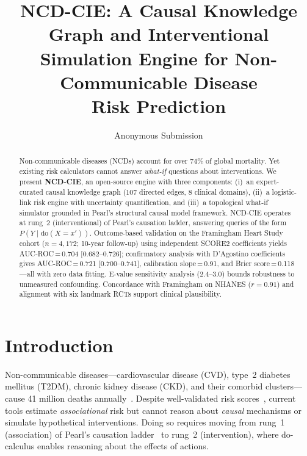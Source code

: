 \documentclass[runningheads]{llncs}
\begin{document}
\title{NCD-CIE: A Causal Knowledge Graph and Interventional\\Simulation Engine for Non-Communicable Disease\\Risk Prediction}

\author{Anonymous Submission}

\maketitle

\begin{abstract}
Non-communicable diseases (NCDs) account for over 74\% of global
mortality.
Yet existing risk calculators cannot answer \emph{what-if} questions
about interventions.
We present \textbf{NCD-CIE}, an open-source engine with three
components:
(i)~an expert-curated causal knowledge graph (107 directed edges,
8 clinical domains),
(ii)~a logistic-link risk engine with uncertainty quantification, and
(iii)~a topological what-if simulator grounded in Pearl's structural
causal model framework.
NCD-CIE operates at rung~2 (interventional) of Pearl's causation
ladder, answering queries of the form
$P(Y \mid \mathrm{do}(X\!=\!x'))$.
Outcome-based validation on the Framingham Heart Study cohort
($n\!=\!4{,}172$; 10-year follow-up) using independent SCORE2
coefficients yields AUC-ROC\,=\,0.704 [0.682--0.726]; confirmatory
analysis with D'Agostino coefficients gives
AUC-ROC\,=\,0.721 [0.700--0.741],
calibration slope\,=\,0.91, and Brier score\,=\,0.118---all with
zero data fitting.
E-value sensitivity analysis (2.4--3.0) bounds robustness to
unmeasured confounding.
Concordance with Framingham on NHANES ($r\!=\!0.91$) and alignment
with six landmark RCTs support clinical plausibility.

\end{abstract}

\section{Introduction}\label{sec:intro}

Non-communicable diseases---cardiovascular disease (CVD), type~2
diabetes mellitus (T2DM), chronic kidney disease (CKD), and their
comorbid clusters---cause 41 million deaths
annually~\cite{who2021ncd}.
Despite well-validated risk scores~\cite{dagostino2008,hippisley2017qrisk3,score22021},
current tools estimate \emph{associational} risk but cannot reason about
\emph{causal} mechanisms or simulate hypothetical interventions.
Doing so requires moving from rung~1 (association) of Pearl's
causation ladder~\cite{pearl2018book} to rung~2 (intervention),
where do-calculus enables reasoning about the effects of actions.
\end{document}
